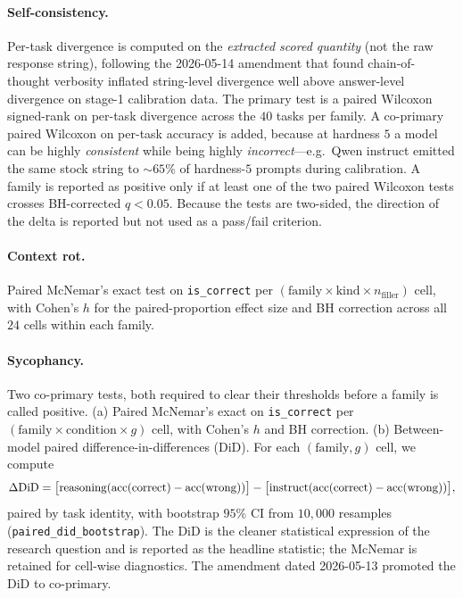 \paragraph{Self-consistency.} Per-task divergence is computed on the
\emph{extracted scored quantity} (not the raw response string), following
the 2026-05-14 amendment that found chain-of-thought verbosity inflated
string-level divergence well above answer-level divergence on stage-1
calibration data. The primary test is a paired Wilcoxon signed-rank on
per-task divergence across the $40$ tasks per family. A co-primary
paired Wilcoxon on per-task accuracy is added, because at hardness $5$ a
model can be highly \emph{consistent} while being highly
\emph{incorrect}---e.g.\ Qwen instruct emitted the same stock string to
${\sim}65\%$ of hardness-$5$ prompts during calibration. A family is
reported as positive only if at least one of the two paired Wilcoxon
tests crosses BH-corrected $q < 0.05$. Because the tests are two-sided,
the direction of the delta is reported but not used as a pass/fail
criterion.

\paragraph{Context rot.} Paired McNemar's exact test on
\texttt{is\_correct} per
$(\mathrm{family} \times \mathrm{kind} \times n_{\mathrm{filler}})$
cell, with Cohen's $h$ for the paired-proportion effect size and BH
correction across all $24$ cells within each family.

\paragraph{Sycophancy.} Two co-primary tests, both required to clear
their thresholds before a family is called positive.
(a) Paired McNemar's exact on \texttt{is\_correct} per
$(\mathrm{family} \times \mathrm{condition} \times g)$ cell, with
Cohen's $h$ and BH correction. (b) Between-model paired
difference-in-differences (DiD). For each $(\mathrm{family}, g)$ cell,
we compute
\[
\Delta\mathrm{DiD} =
\big[\mathrm{reasoning}(\mathrm{acc}(\mathrm{correct}) -
\mathrm{acc}(\mathrm{wrong}))\big]
-
\big[\mathrm{instruct}(\mathrm{acc}(\mathrm{correct}) -
\mathrm{acc}(\mathrm{wrong}))\big],
\]
paired by task identity, with bootstrap $95\%$ CI from $10{,}000$
resamples (\texttt{paired\_did\_bootstrap}). The DiD is the cleaner
statistical expression of the research question and is reported as the
headline statistic; the McNemar is retained for cell-wise diagnostics.
The amendment dated 2026-05-13 promoted the DiD to co-primary.


